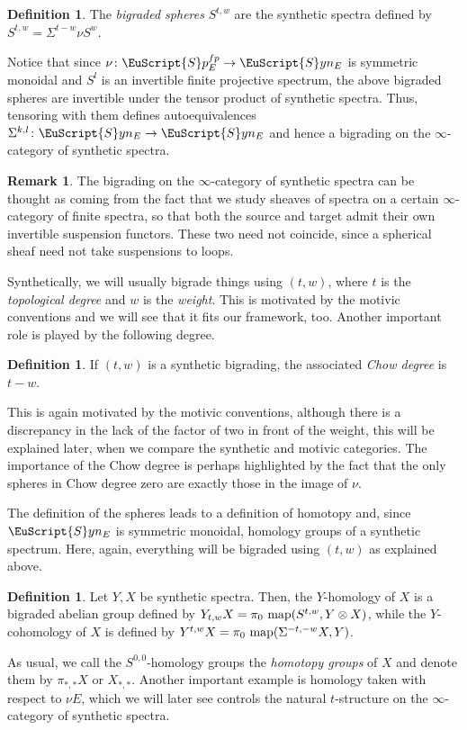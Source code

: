 \documentclass[oneside,a4paper]{amsart}
\newcommand{\euscr}[1]{\EuScript{#1}} %
\newcommand{\map}{\textnormal{map}} %
\newcommand{\spectra}{\euscr{S}p} %
\newcommand{\synspectra}{\euscr{S}yn} %
\theoremstyle{plain}
\theoremstyle{definition}
\newtheorem{defin}[thm]{Definition}
\newtheorem{rem}[thm]{Remark}
\theoremstyle{remark}
\begin{document}
\begin{defin}
The \emph{bigraded spheres} $S^{t, w}$ are the synthetic spectra defined by $S^{t, w} = \Sigma^{t-w} \nu S^{w}$. 
\end{defin}
Notice that since $\nu \colon \spectra_{E}^{fp} \rightarrow \synspectra_{E}$ is symmetric monoidal and $S^{l}$ is an invertible finite projective spectrum, the above bigraded spheres are invertible under the tensor product of synthetic spectra. Thus, tensoring with them defines autoequivalences $\Sigma^{k, l} \colon \synspectra_{E} \rightarrow \synspectra_{E}$ and hence a bigrading on the $\infty$-category of synthetic spectra. 

\begin{rem}
The bigrading on the $\infty$-category of synthetic spectra can be thought as coming from the fact that we study sheaves of spectra on a certain $\infty$-category of finite spectra, so that both the source and target admit their own invertible suspension functors. These two need not coincide, since a spherical sheaf need not take suspensions to loops. 
\end{rem}
Synthetically, we will usually bigrade things using $(t, w)$, where $t$ is the \emph{topological degree} and $w$ is the \emph{weight}. This is motivated by the motivic conventions and we will see that it fits our framework, too. Another important role is played by the following degree. 

\begin{defin}
If $(t, w)$ is a synthetic bigrading, the associated \emph{Chow degree} is $t-w$. 
\end{defin}
This is again motivated by the motivic conventions, although there is a discrepancy in the lack of the factor of two in front of the weight, this will be explained later, when we compare the synthetic and motivic categories. The importance of the Chow degree is perhaps highlighted by the fact that the only spheres in Chow degree zero are exactly those in the image of $\nu$. 

The definition of the spheres leads to a definition of homotopy and, since $\synspectra_{E}$ is symmetric monoidal, homology groups of a synthetic spectrum. Here, again, everything will be bigraded using $(t, w)$ as explained above. 

\begin{defin}
Let $Y, X$ be synthetic spectra. Then, the $Y$-homology of $X$ is a bigraded abelian group defined by $Y_{t, w}X = \pi_{0} \ \map(S^{t, w}, Y \otimes X)$, while the $Y$-cohomology of $X$ is defined by $Y^{t, w}X = \pi_{0} \ \map(\Sigma^{-t, -w} X , Y)$.
\end{defin}
As usual, we call the $S^{0, 0}$-homology groups the \emph{homotopy groups} of $X$ and denote them by $\pi_{*, *}X$ or $X_{*, *}$. Another important example is homology taken with respect to $\nu E$, which we will later see controls the natural $t$-structure on the $\infty$-category of synthetic spectra. 
\end{document}
